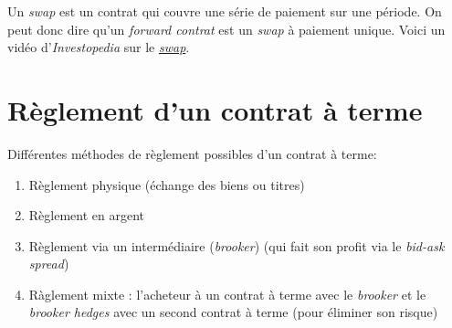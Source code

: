 \documentclass[11pt,french]{report}
\begin{document}
Un \emph{swap} est un contrat qui couvre une série de paiement sur une période. On peut donc dire qu'un \emph{forward contrat} est un \emph{swap} à paiement unique. Voici un vidéo d'\emph{Investopedia} sur le \href{http://www.investopedia.com/terms/s/swap.asp?o=40186&l=dir&qsrc=999&qo=investopediaSiteSearch}{\emph{swap}}.

\section{Règlement d'un contrat à terme}
\label{sec:règlement contrat à terme}

Différentes méthodes de règlement possibles d'un contrat à terme:
\begin{enumerate}
\item Règlement physique (échange des biens ou titres)
\item Règlement en argent
\item Règlement via un intermédiaire (\emph{brooker}) (qui fait son profit via le \emph{bid-ask spread})
\item Ràglement mixte : l'acheteur à un contrat à terme avec le \emph{brooker} et le \emph{brooker hedges} avec un second contrat à terme (pour éliminer son risque) 
\end{enumerate}
\end{document}
